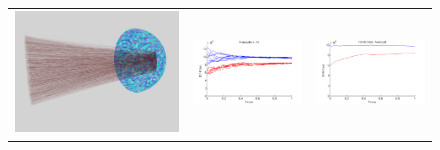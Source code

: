 \documentclass[twocolumn]{article}
\begin{document}
\begin{figure}
\begin{tabular}{|c|c|c|}
\\
\hline
\includegraphics[scale=.2]{hemisphere_demo.png}
&\includegraphics[scale=.35]{hemisphere_all.png}
&\includegraphics[scale=.35]{hemisphere_average.png}

\end{tabular}
\end{figure}
\end{document}
